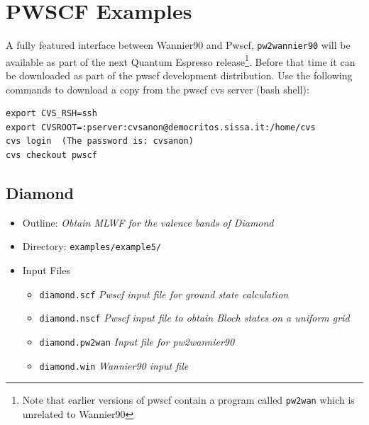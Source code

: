 \documentclass[a4paper,11pt,twoside]{article}
\begin{document}
\cleardoublepage

\section*{PWSCF Examples}

A fully featured interface between Wannier90 and Pwscf, {\tt pw2wannier90} will be available as part of the 
next Quantum Espresso release\footnote{Note that earlier versions of pwscf contain a program called
{\tt pw2wan} which is unrelated to Wannier90}. Before that time it can be downloaded as part of the
pwscf development distribution. Use the following commands to download a copy from the
pwscf cvs server (bash shell):
\begin{verbatim}
export CVS_RSH=ssh
export CVSROOT=:pserver:cvsanon@democritos.sissa.it:/home/cvs
cvs login  (The password is: cvsanon)
cvs checkout pwscf
\end{verbatim}

\subsection*{Diamond}
\begin{itemize}
\item{Outline: \it{Obtain MLWF for the valence bands of Diamond}}
\item{Directory: {\tt examples/example5/}}
\item{Input Files}
\begin{itemize}
\item{ {\tt diamond.scf}  {\it Pwscf input file for ground state calculation}}
\item{ {\tt diamond.nscf}  {\it Pwscf input file to obtain Bloch states on a uniform grid}}
\item{ {\tt diamond.pw2wan}  {\it Input file for pw2wannier90}}
\item{ {\tt diamond.win}  {\it Wannier90 input file}}
\end{itemize}

\end{itemize}
\end{document}
